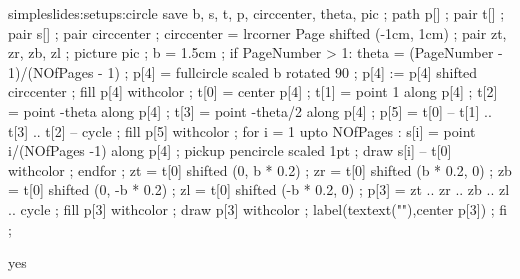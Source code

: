 \startsetups simpleslides:setups:circle
save b, s, t, p, circcenter, theta, pic ;
path p[] ;
pair t[] ;
pair s[] ;
pair circcenter ; circcenter = lrcorner Page shifted (-1cm, 1cm) ;
pair zt, zr, zb, zl ;
picture pic ;
b = 1.5cm ;
if PageNumber > 1:
	theta = (PageNumber - 1)/(NOfPages - 1) ;
 	p[4] = fullcircle scaled b rotated 90 ;
	p[4] := p[4] shifted circcenter ;
 	fill p[4] withcolor  ;
 	t[0] = center p[4] ;
 	t[1] = point 1 along p[4] ;
 	t[2] = point -theta along p[4] ;
 	t[3] = point -theta/2 along p[4] ;
 	p[5] = t[0] -- t[1] .. t[3] .. t[2] -- cycle ;
 	fill p[5] withcolor  ;
 	for i = 1 upto NOfPages :
 		s[i] = point i/(NOfPages -1) along p[4] ;
 		pickup pencircle scaled 1pt ;
 		draw s[i] -- t[0] withcolor  ;
 	endfor ;
 	zt = t[0] shifted (0, b * 0.2) ;
	zr = t[0] shifted (b * 0.2, 0) ;
	zb = t[0] shifted (0, -b * 0.2) ;
	zl = t[0] shifted (-b * 0.2, 0) ;
	p[3] = zt .. zr .. zb .. zl .. cycle ;
 	fill p[3] withcolor   ;
 	draw p[3] withcolor  ;
 	label(textext("\switchtobodyfont[10pt]\pagenumber\stopcolor"),center p[3]) ;
fi ;
\stopuseMPgraphic 
\stopsetups

    {}
    {}

\doif%
  {}
  {yes}
  {}


\setuplayout [width=fit,
              margin=0cm,
              height=fit,
              header=3cm, 
              footer=0.8cm, 
              topspace=.6cm, 
              backspace=1cm,
              location=singlesided]




\setupcombinations[distance=1.85cm]

